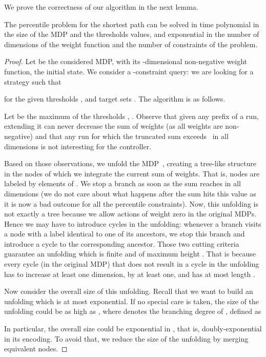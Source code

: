\documentclass{llncs}
\begin{document}
We prove the correctness of our algorithm in the next lemma.

\begin{lemma}
\label{lem:sp_alg}
The percentile problem for the shortest path can be solved in time polynomial in the size of the MDP and the thresholds values, and exponential in the number of dimensions of the weight function and the number of constraints of the problem.
\end{lemma}


\begin{proof}
Let  be the considered MDP,  with  its -dimensional non-negative weight function,  the initial state. We consider a -constraint query: we are looking for a strategy  such that

for the given thresholds ,  and target sets . The algorithm is as follows.

Let  be the maximum of the thresholds , . Observe that given any prefix of a run, extending it can never decrease the sum of weights (as all weights are non-negative) and that any run for which the truncated sum exceeds~ in all dimensions is not interesting for the controller.

Based on those observations, we unfold the MDP~, creating a tree-like structure in the nodes of which we integrate the current sum of weights. That is, nodes are labeled by elements of . We stop a branch as soon as the sum reaches  in all dimensions (we do not care about what happens after the sum hits this value as it is now a bad outcome for all the percentile constraints). Now, this unfolding is not exactly a tree because we allow actions of weight zero in the original MDPs. Hence we may have to introduce cycles in the unfolding: whenever a branch visits a node with a label identical to one of its ancestors, we stop this branch and introduce a cycle to the corresponding ancestor. Those two cutting criteria guarantee an unfolding which is finite and of maximum height . That is because every cycle (in the original MDP) that does not result in a cycle in the unfolding has to increase at least one dimension, by at least one, and has at most length .

Now consider the overall size of this unfolding. Recall that we want to build an unfolding which is at most exponential. If no special care is taken, the size of the unfolding could be as high as , where  denotes the branching degree of , defined as

In particular, the overall size could be exponential in , that is, doubly-exponential in its encoding. To avoid that, we reduce the size of the unfolding by merging equivalent nodes.


\end{proof}
\end{document}
